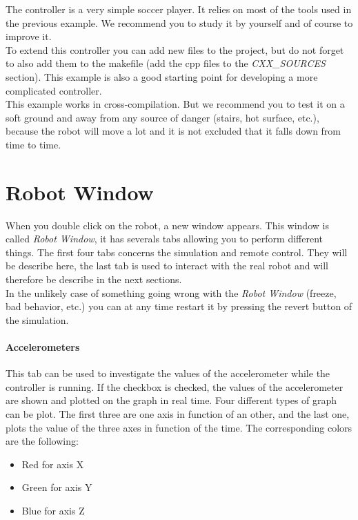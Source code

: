 \documentclass[a4paper, 12pt]{article}  		%
\begin{document}
The controller is a very simple soccer player. It relies on most of the tools used in the previous example. We recommend you to study it by yourself and of course to improve it.\\

To extend this controller you can add new files to the project, but do not forget to also add them to the makefile (add the cpp files to the \textit{CXX\_SOURCES} section). This example is also a good starting point for developing a more complicated controller.\\

This example works in cross-compilation. But we recommend you to test it on a soft ground and away from any source of danger (stairs, hot surface, etc.), because the robot will move a lot and it is not excluded that it falls down from time to time.\\



\newpage
\section{Robot Window}

When you double click on the robot, a new window appears. This window is called \textit{Robot Window}, it has severals tabs allowing you to perform different things. The first four tabs concerns the simulation and remote control. They will be describe here, the last tab is used to interact with the real robot and will therefore be describe in the next sections.\\

In the unlikely case of something going wrong with the \textit{Robot Window} (freeze, bad behavior, etc.) you can at any time restart it by pressing the revert button of the simulation.\\

\paragraph*{Accelerometers} 
This tab can be used to investigate the values of the accelerometer while the controller is running. If the checkbox is checked, the values of the accelerometer are shown and plotted on the graph in real time. Four different types of graph can be plot. The first three are one axis in function of an other, and the last one, plots the value of the three axes in function of the time. The corresponding colors are the following:\\
\begin{itemize}
\item Red for axis X
\item Green for axis Y
\item Blue for axis Z
\end{itemize}
\end{document}
